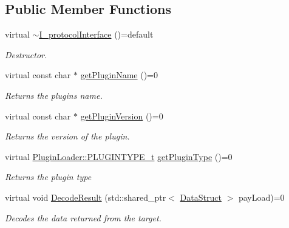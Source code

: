 \subsection*{Public Member Functions}
\begin{DoxyCompactItemize}
\item 
\mbox{\label{classProtocol_1_1I__protocolInterface_acecee473aa72142986456353a5c224f7}} 
virtual \mbox{\hyperlink{classProtocol_1_1I__protocolInterface_acecee473aa72142986456353a5c224f7}{$\sim$\+I\+\_\+protocol\+Interface}} ()=default
\begin{DoxyCompactList}\small\item\em Destructor. \end{DoxyCompactList}\item 
virtual const char $\ast$ \mbox{\hyperlink{classProtocol_1_1I__protocolInterface_a53e95b7d9ea9ad8ee179c2663511ce20}{get\+Plugin\+Name}} ()=0
\begin{DoxyCompactList}\small\item\em Returns the plugins name. \end{DoxyCompactList}\item 
virtual const char $\ast$ \mbox{\hyperlink{classProtocol_1_1I__protocolInterface_abbdaeb43eba4c18b57e6f7010d9209bc}{get\+Plugin\+Version}} ()=0
\begin{DoxyCompactList}\small\item\em Returns the version of the plugin. \end{DoxyCompactList}\item 
virtual \mbox{\hyperlink{namespacePluginLoader_a7b1358e9577b47b5d4b16231a5a81699}{Plugin\+Loader\+::\+P\+L\+U\+G\+I\+N\+T\+Y\+P\+E\+\_\+t}} \mbox{\hyperlink{classProtocol_1_1I__protocolInterface_aaa1010c6c48d6a4a99998ae383f2172c}{get\+Plugin\+Type}} ()=0
\begin{DoxyCompactList}\small\item\em Returns the plugin {\itshape type} \end{DoxyCompactList}\item 
virtual void \mbox{\hyperlink{classProtocol_1_1I__protocolInterface_a49178196621b840100cb08cc86f3c122}{Decode\+Result}} (std\+::shared\+\_\+ptr$<$ \mbox{\hyperlink{structProtocol_1_1DataStruct}{Data\+Struct}} $>$ pay\+Load)=0
\begin{DoxyCompactList}\small\item\em Decodes the data returned from the target. \end{DoxyCompactList}\item 

\end{DoxyCompactItemize}
